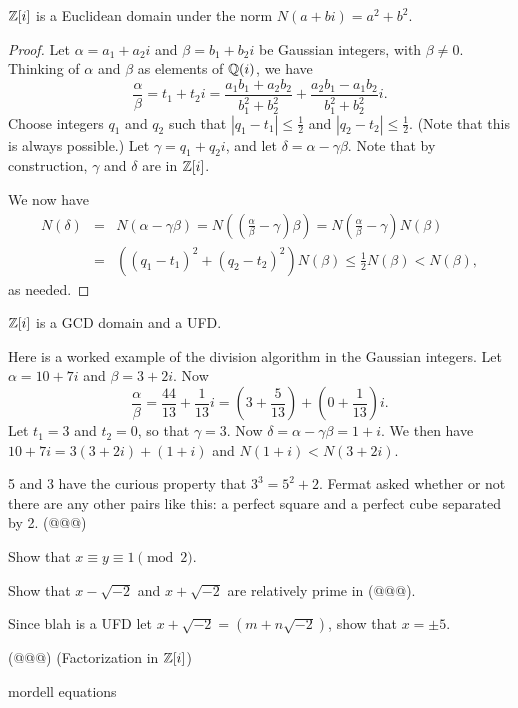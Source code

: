 \begin{prop}
\(\mathbb{Z}[i]\) is a Euclidean domain under the norm \(N(a+bi) = a^2 + b^2\).
\end{prop}

\begin{proof}
Let \(\alpha = a_1 + a_2 i\) and \(\beta = b_1 + b_2 i\) be Gaussian integers, with \(\beta \neq 0\). Thinking of \(\alpha\) and \(\beta\) as elements of \(\mathbb{Q}(i)\), we have \[ \frac{\alpha}{\beta} = t_1 + t_2 i = \frac{a_1b_1 + a_2b_2}{b_1^2 + b_2^2} + \frac{a_2b_1 - a_1b_2}{b_1^2 + b_2^2} i. \] Choose integers \(q_1\) and \(q_2\) such that \(|q_1 - t_1| \leq \frac{1}{2}\) and \(|q_2 - t_2| \leq \frac{1}{2}\). (Note that this is always possible.) Let \(\gamma = q_1 + q_2 i\), and let \(\delta = \alpha - \gamma\beta\). Note that by construction, \(\gamma\) and \(\delta\) are in \(\mathbb{Z}[i]\).

We now have
\begin{eqnarray*}
N(\delta) & = & N(\alpha - \gamma\beta) = N\left((\frac{\alpha}{\beta} - \gamma)\beta\right) = N(\frac{\alpha}{\beta} - \gamma)N(\beta) \\
 & = & ((q_1-t_1)^2 + (q_2-t_2)^2)N(\beta) \leq \frac{1}{2}N(\beta) < N(\beta),
\end{eqnarray*}
as needed.
\end{proof}

\begin{cor}
\(\mathbb{Z}[i]\) is a GCD domain and a UFD.
\end{cor}

Here is a worked example of the division algorithm in the Gaussian integers. Let \(\alpha = 10+7i\) and \(\beta = 3+2i\). Now \[ \frac{\alpha}{\beta} = \frac{44}{13} + \frac{1}{13}i = (3 + \frac{5}{13}) + (0 + \frac{1}{13})i. \] Let \(t_1 = 3\) and \(t_2 = 0\), so that \(\gamma = 3\). Now \(\delta = \alpha - \gamma\beta = 1+i\). We then have \(10+7i = 3(3+2i) + (1+i)\) and \(N(1+i) < N(3+2i)\).


\Exercises%

\begin{exercise}
5 and 3 have the curious property that \(3^3 = 5^2 + 2\). Fermat asked whether or not there are any other pairs like this: a perfect square and a perfect cube separated by 2. (@@@)
\begin{proplist}
\item Show that \(x \equiv y \equiv 1 \pmod{2}\).
\item Show that \(x - \sqrt{-2}\) and \(x + \sqrt{-2}\) are relatively prime in (@@@).
\item Since blah is a UFD let \(x + \sqrt{-2} = (m+n\sqrt{-2})\), show that \(x = \pm 5\).
\end{proplist}
\end{exercise}

\begin{exercise}
(@@@) (Factorization in \(\mathbb{Z}[i]\))
\end{exercise}

mordell equations
